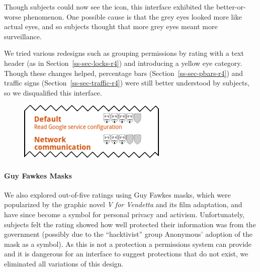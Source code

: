 \documentclass[11pt]{article}
\newcommand{\refsec}[1]{Section~\ref{#1}}
\begin{document}
Though subjects could now see the icon, this interface exhibited 
the better-or-worse phenomenon. One possible cause is that 
the grey eyes looked more like actual eyes, and so subjects thought that more 
grey eyes meant more surveillance. 

We tried various redesigns such as grouping permissions by rating with a
text header (as 
in \refsec{ss-sec-locks-r4}) and introducing a yellow eye category. Though these changes helped, 
percentage bars (\refsec{ss-sec-pbars-r4}) and traffic signs 
(\refsec{ss-sec-traffic-r4}) were still better understood by subjects,
so we disqualified this interface.


\begin{figure}
\begin{center}
\includegraphics[width=.9\linewidth]{candidate-img/masks/masksR1.png}
\end{center}
\end{figure}

\paragraph{Guy Fawkes Masks}
\label{s-sec-masks}

We also explored out-of-five ratings using Guy Fawkes masks, which 
were popularized by the graphic novel \emph{V for Vendetta} and its
film adaptation, and have since become a symbol for personal
privacy and activism.
\label{ss-sec-masks-r1}
Unfortunately, subjects felt the
rating showed how well protected their information was from the government 
(possibly due to the ``hacktivist'' group Anonymous' adoption of the mask as a symbol). 
As this is not a protection a permissions system can provide and it is dangerous for an
interface to suggest protections that do not exist, we eliminated all
variations of this design.
\end{document}
